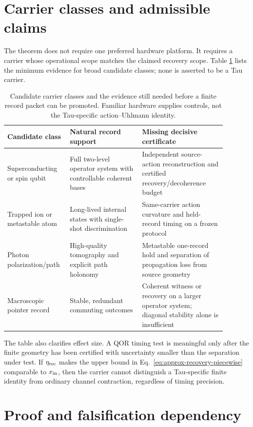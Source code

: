 \documentclass[11pt]{article}
\begin{document}
\section{Carrier classes and admissible claims}

The theorem does not require one preferred hardware platform.  It requires a
carrier whose operational scope matches the claimed recovery scope.  Table
\ref{tab:carrier-classes} lists the minimum evidence for broad candidate
classes; none is asserted to be a Tau carrier.

\begin{table}[t]
\centering
\small
\begin{tabular}{p{0.22\linewidth}p{0.31\linewidth}p{0.36\linewidth}}
\toprule
Candidate class & Natural record support & Missing decisive certificate\\
\midrule
Superconducting or spin qubit
& Full two-level operator system with controllable coherent bases
& Independent source-action reconstruction and certified recovery/decoherence budget\\
Trapped ion or metastable atom
& Long-lived internal states with single-shot discrimination
& Same-carrier action curvature and held-record timing on a frozen protocol\\
Photon polarization/path
& High-quality tomography and explicit path holonomy
& Metastable one-record hold and separation of propagation loss from source geometry\\
Macroscopic pointer record
& Stable, redundant commuting outcomes
& Coherent witness or recovery on a larger operator system; diagonal stability alone is insufficient\\
\bottomrule
\end{tabular}
\caption{Candidate carrier classes and the evidence still needed before a
finite record packet can be promoted.  Familiar hardware supplies controls,
not the Tau-specific action--Uhlmann identity.}
\label{tab:carrier-classes}
\end{table}

The table also clarifies effect size.  A QOR timing test is meaningful only
after the finite geometry has been certified with uncertainty smaller than
the separation under test.  If \(\eta_{\rm rec}\) makes the upper bound in
Eq.~\eqref{eq:approx-recovery-piecewise} comparable to \(x_{\rm in}\), then
the carrier cannot distinguish a Tau-specific finite identity from ordinary
channel contraction, regardless of timing precision.

\section{Proof and falsification dependency}
\end{document}
